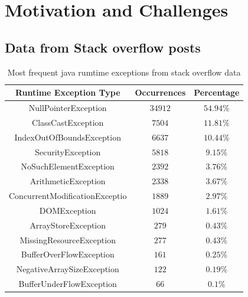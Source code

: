 \documentclass{sigplanconf}
\begin{document}
\section{Motivation and Challenges}
\label{sec:mot}

\subsection{Data from Stack overflow posts}
\label{subsec:stackoverflow}

\begin{table}[h]
\caption{Most frequent java rumtime exceptions from stack overflow data}
\label{tab:stackoverlow}
\begin{tabular}{|c|c|c|}
\hline
\textbf{Runtime Exception Type} & \textbf{Occurrences} & \textbf{Percentage}\\
\hline NullPointerException & $34912$ & $54.94\%$ \\ \hline

ClassCastException & $7504$ & $11.81\%$ \\ \hline

IndexOutOfBoundsException & $6637$ & $10.44\%$ \\ \hline

SecurityException  & $5818$ & $9.15\%$ \\  \hline

NoSuchElementException & $2392$ & $3.76\%$ \\ \hline

ArithmeticException & $2338$ & $3.67\%$ \\ \hline

ConcurrentModificationExceptio & $1889$ & $2.97\%$ \\ \hline

DOMException & $1024$ & $1.61\%$ \\ \hline

ArrayStoreException & $279$ & $0.43\%$ \\ \hline

MissingResourceException & $277$ & $0.43\%$ \\ \hline

BufferOverFlowException & $161$ & $0.25\%$ \\ \hline

NegativeArraySizeException & $122$ & $0.19\%$ \\ \hline

BufferUnderFlowException & $66$ & $0.1\%$ \\ \hline


\end{tabular}
\end{table}
\end{document}
